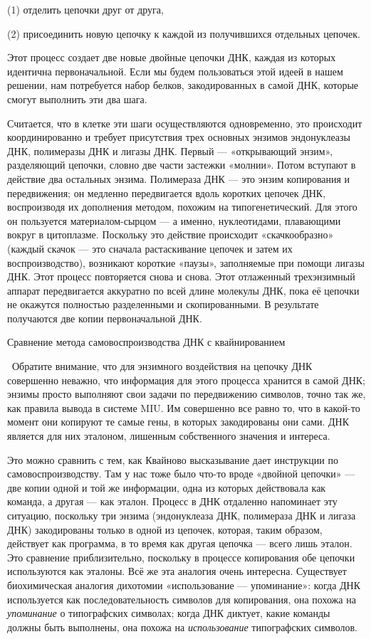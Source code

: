 \documentclass[../main.tex]{subfiles}
\begin{document}
(1) отделить цепочки друг от друга,

(2) присоединить новую цепочку к каждой из получившихся отдельных цепочек.

Этот процесс создает две новые двойные цепочки ДНК, каждая из которых идентична первоначальной. Если мы будем пользоваться этой идеей в нашем решении, нам потребуется набор белков, закодированных в самой ДНК, которые смогут выполнить эти два шага.

Считается, что в клетке эти шаги осуществляются одновременно, это происходит координированно и требует присутствия трех основных энзимов эндонуклеазы ДНК, полимеразы ДНК и лигазы ДНК\@. Первый --- «открывающий энзим», разделяющий цепочки, словно две части застежки «молнии». Потом вступают в действие два остальных энзима. Полимераза ДНК --- это энзим копирования и передвижения; он медленно передвигается вдоль коротких цепочек ДНК, воспроизводя их дополнения методом, похожим на типогенетический. Для этого он пользуется материалом-сырцом --- а именно, нуклеотидами, плавающими вокруг в цитоплазме. Поскольку это действие происходит «скачкообразно» (каждый скачок --- это сначала растаскивание цепочек и затем их воспроизводство), возникают короткие «паузы», заполняемые при помощи лигазы ДНК\@. Этот процесс повторяется снова и снова. Этот отлаженный трехэнзимный аппарат передвигается аккуратно по всей длине молекулы ДНК, пока её цепочки не окажутся полностью разделенными и скопированными. В результате получаются две копии первоначальной ДНК.

Сравнение метода самовоспроизводства ДНК с квайнированием

~Обратите внимание, что для энзимного воздействия на цепочку ДНК совершенно неважно, что информация для этого процесса хранится в самой ДНК; энзимы просто выполняют свои задачи по передвижению символов, точно так же, как правила вывода в системе MIU\@. Им совершенно все равно то, что в какой-то момент они копируют те самые гены, в которых закодированы они сами. ДНК является для них эталоном, лишенным собственного значения и интереса.

Это можно сравнить с тем, как Квайново высказывание дает инструкции по самовоспроизводству. Там у нас тоже было что-то вроде «двойной цепочки» --- две копии одной и той же информации, одна из которых действовала как команда, а другая --- как эталон. Процесс в ДНК отдаленно напоминает эту ситуацию, поскольку три энзима (эндонуклеаза ДНК, полимераза ДНК и лигаза ДНК) закодированы только в одной из цепочек, которая, таким образом, действует как программа, в то время как другая цепочка --- всего лишь эталон. Это сравнение приблизительно, поскольку в процессе копирования обе цепочки используются как эталоны. Всё же эта аналогия очень интересна. Существует биохимическая аналогия дихотомии «использование --- упоминание»: когда ДНК используется как последовательность символов для копирования, она похожа на \emph{упоминание} о типографских символах; когда ДНК диктует, какие команды должны быть выполнены, она похожа на \emph{использование} типографских символов.
\end{document}
